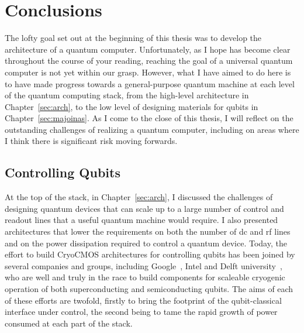 \chapter{Conclusions}

The lofty goal set out at the beginning of this thesis was to develop the architecture of a quantum computer. Unfortunately,
as I hope has become clear throughout the course of your reading, reaching the goal of a universal quantum computer
is not yet within our grasp. However, what I have aimed to do here is to have made progress towards a general-purpose quantum machine at each
level of the quantum computing stack, from the high-level architecture in Chapter~\ref{sec:arch}, to the low level
of designing materials for qubits in Chapter~\ref{sec:majoinas}. As I come to the close of this thesis, I will reflect on the outstanding
challenges of realizing a quantum computer, including on areas where I think there is significant risk moving forwards.

\section{Controlling Qubits}
At the top of the stack, in Chapter~\ref{sec:arch}, I discussed the challenges of designing quantum devices that can scale up to a large number of
control and readout lines that a useful quantum machine would require. I also presented architectures that lower the
requirements on both the number of dc and rf lines and on the power dissipation required to control a quantum device. Today, the effort to build
CryoCMOS architectures for controlling qubits has been joined by several companies and groups, including Google~\cite{gcryocmos}, Intel and Delft university~\cite{VANDIJK201990},
who are well and truly in the race to build components for scaleable cryogenic operation of both superconducting and semiconducting qubits. The aims of each
of these efforts are twofold, firstly to bring the footprint of the qubit-classical interface under control, the second being
to tame the rapid growth of power consumed at each part of the stack.

